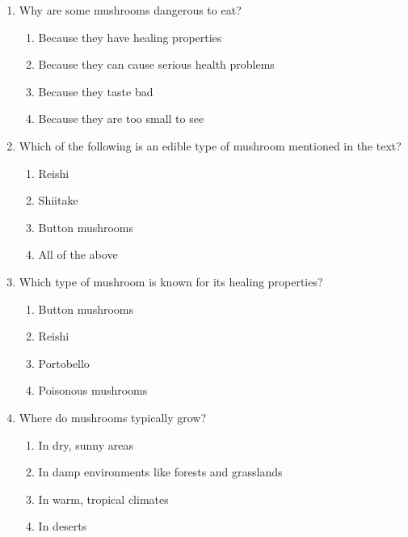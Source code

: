 \documentclass[12pt]{article}
\begin{document}
\begin{enumerate}
    \item Why are some mushrooms dangerous to eat?
    \begin{enumerate}[label=\Alph*.]
        \item Because they have healing properties
        \item Because they can cause serious health problems
        \item Because they taste bad
        \item Because they are too small to see
    \end{enumerate}
    \vspace{0.5cm}

    \item Which of the following is an edible type of mushroom mentioned in the text?
    \begin{enumerate}[label=\Alph*.]
        \item Reishi
        \item Shiitake
        \item Button mushrooms
        \item All of the above
    \end{enumerate}
    \vspace{0.5cm}

    \item Which type of mushroom is known for its healing properties?
    \begin{enumerate}[label=\Alph*.]
        \item Button mushrooms
        \item Reishi
        \item Portobello
        \item Poisonous mushrooms
    \end{enumerate}
    \vspace{0.5cm}

\vspace{1cm}
    \item Where do mushrooms typically grow?
    \begin{enumerate}[label=\Alph*.]
        \item In dry, sunny areas
        \item In damp environments like forests and grasslands
        \item In warm, tropical climates
        \item In deserts
    \end{enumerate}
    \vspace{0.5cm}


\end{enumerate}
\end{document}
